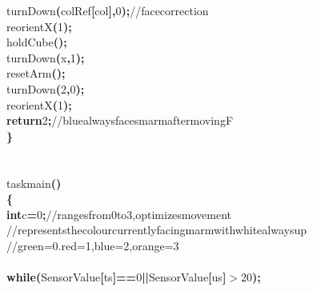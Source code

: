 \documentclass[a4paper, 10pt]{article}
\newcommand\SPC{\hspace*{0.6em}}
\newcommand\TAB{\hspace*{1.2em}}
\newcommand\HYP{\mbox{\char 45}}
\newcommand{\CppAComment}[1]{\textcolor[rgb]{0,0.5,0}{\colorbox[rgb]{1,1,1}{#1}}}
\newcommand{\CppAIdentifier}[1]{#1}
\newcommand{\CppANumber}[1]{\textcolor[rgb]{0,0,1}{\colorbox[rgb]{1,1,1}{#1}}}
\newcommand{\CppAReservedWord}[1]{\textbf{\colorbox[rgb]{1,1,1}{#1}}}
\newcommand{\CppASpace}[1]{\colorbox[rgb]{1,1,1}{#1}}
\newcommand{\CppASymbol}[1]{\textbf{\textcolor[rgb]{1,0,0}{\colorbox[rgb]{1,1,1}{#1}}}}
\begin{document}
\begin{ttfamily}
\CppASpace{\TAB }\CppAIdentifier{turnDown}\CppASymbol{(}\CppAIdentifier{colRef}\CppASymbol{[}\CppAIdentifier{col}\CppASymbol{]}\CppASymbol{,}\CppASpace{\SPC }\CppANumber{0}\CppASymbol{)}\CppASymbol{;}\CppASpace{\SPC }\CppAComment{//\SPC face\SPC correction}\\
\CppASpace{\TAB }\CppAIdentifier{reorientX}\CppASymbol{(}\CppANumber{1}\CppASymbol{)}\CppASymbol{;}\\
\CppASpace{\TAB }\CppAIdentifier{holdCube}\CppASymbol{(}\CppASymbol{)}\CppASymbol{;}\\
\CppASpace{\TAB }\CppAIdentifier{turnDown}\CppASymbol{(}\CppAIdentifier{x}\CppASymbol{,}\CppANumber{1}\CppASymbol{)}\CppASymbol{;}\\
\CppASpace{\TAB }\CppAIdentifier{resetArm}\CppASymbol{(}\CppASymbol{)}\CppASymbol{;}\\
\CppASpace{\TAB }\CppAIdentifier{turnDown}\CppASymbol{(}\CppASymbol{\HYP }\CppANumber{2}\CppASymbol{,}\CppANumber{0}\CppASymbol{)}\CppASymbol{;}\\
\CppASpace{\TAB }\CppAIdentifier{reorientX}\CppASymbol{(}\CppANumber{1}\CppASymbol{)}\CppASymbol{;}\\
\CppASpace{\TAB }\CppAReservedWord{return}\CppASpace{\SPC }\CppANumber{2}\CppASymbol{;}\CppASpace{\SPC }\CppAComment{//\SPC blue\SPC always\SPC faces\SPC marm\SPC after\SPC moving\SPC F}\\
\CppASymbol{\}}\\
\\
\\
\CppAIdentifier{task}\CppASpace{\SPC }\CppAIdentifier{main}\CppASymbol{(}\CppASymbol{)}\\
\CppASymbol{\{}\\
\CppASpace{\TAB }\CppAReservedWord{int}\CppASpace{\SPC }\CppAIdentifier{c}\CppASymbol{=}\CppANumber{0}\CppASymbol{;}\CppASpace{\SPC }\CppAComment{//\SPC ranges\SPC from\SPC 0\SPC to\SPC 3,\SPC optimizes\SPC movement}\\
\CppASpace{\TAB }\CppAComment{//\SPC represents\SPC the\SPC colour\SPC currently\SPC facing\SPC marm\SPC with\SPC white\SPC always\SPC up}\\
\CppASpace{\TAB }\CppAComment{//\SPC green=0.\SPC red=1,\SPC blue=2,\SPC orange=3}\\
\\
\CppASpace{\TAB }\CppAReservedWord{while}\CppASymbol{(}\CppAIdentifier{SensorValue}\CppASymbol{[}\CppAIdentifier{ts}\CppASymbol{]}\CppASymbol{==}\CppANumber{0}\CppASymbol{||}\CppAIdentifier{SensorValue}\CppASymbol{[}\CppAIdentifier{us}\CppASymbol{]}\CppASymbol{$>$}\CppANumber{20}\CppASymbol{)}\CppASymbol{;}\\

\end{ttfamily}
\end{document}
